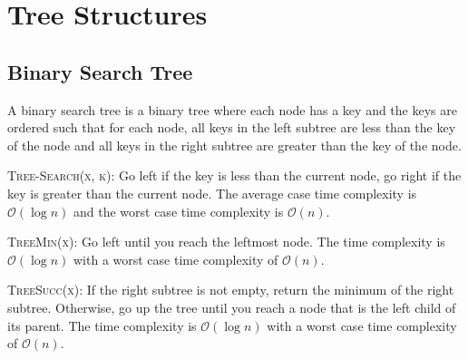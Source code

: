 \section{Tree Structures}
\subsection{Binary Search Tree}
A binary search tree is a binary tree where each node has a key and the keys are ordered such that for each node, all keys in the left subtree are less than the key of the node and all keys in the right subtree are greater than the key of the node. 

\begin{algorithm}
    \caption{\textsc{Tree-Search(x, k)}: Go left if the key is less than the current node, go right if the key is greater than the current node. The average case time complexity is \( \mathcal{O}(\log n) \) and the worst case time complexity is \( \mathcal{O}(n) \).}
    \begin{algorithmic}
            \State{}
        \EndIf{}
            \State{}
        \Else{}
            \State{}
        \EndIf{}
    \end{algorithmic}
\end{algorithm}
    
\begin{algorithm}
    \caption{\textsc{TreeMin(x)}: Go left until you reach the leftmost node. The time complexity is \( \mathcal{O}(\log n) \) with a worst case time complexity of \( \mathcal{O}(n) \).}
    \begin{algorithmic}
            \State{}
        \EndIf{}
        \State{}
    \end{algorithmic}
\end{algorithm}

\begin{algorithm}
    \caption{\textsc{TreeSucc(x)}: If the right subtree is not empty, return the minimum of the right subtree. Otherwise, go up the tree until you reach a node that is the left child of its parent. The time complexity is \( \mathcal{O}(\log n) \) with a worst case time complexity of \( \mathcal{O}(n) \).}
    \begin{algorithmic}
            \State{}
        \EndIf{}
        \EndWhile{}
        \State{}
    \end{algorithmic}
\end{algorithm}

